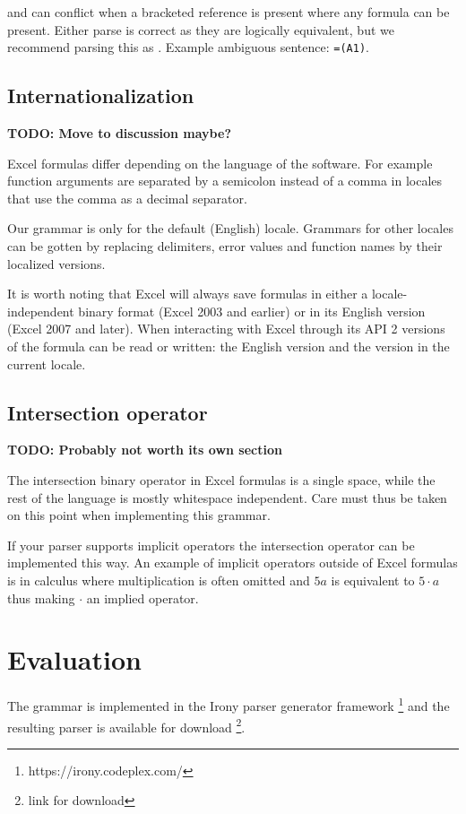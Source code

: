 \documentclass[conference]{IEEEtran}
\newcommand{\todo}[1]{\textbf{TODO: #1}}
\begin{document}
 and  can conflict when a bracketed reference is present where any formula can be present. Either parse is correct as they are logically equivalent, but we recommend parsing this as . Example ambiguous sentence: \texttt{=(A1)}.

\subsection{Internationalization}

\todo{Move to discussion maybe?}

Excel formulas differ depending on the language of the software. For example function arguments are separated by a semicolon instead of a comma in locales that use the comma as a decimal separator.

Our grammar is only for the default (English) locale. Grammars for other locales can be gotten by replacing delimiters, error values and function names by their localized versions.

It is worth noting that Excel will always save formulas in either a locale-independent binary format (Excel 2003 and earlier) or in its English version (Excel 2007 and later). When interacting with Excel through its API 2 versions of the formula can be read or written: the English version and the version in the current locale.

\subsection{Intersection operator}

\todo{Probably not worth its own section}

The intersection binary operator in Excel formulas is a single space, while the rest of the language is mostly whitespace independent.
Care must thus be taken on this point when implementing this grammar.

If your parser supports implicit operators the intersection operator can be implemented this way.
An example of implicit operators outside of Excel formulas is in calculus where multiplication is often omitted and $5a$ is equivalent to $5 \cdot a$ thus making $\cdot$ an implied operator.


\section{Evaluation}
The grammar is implemented in the Irony parser generator framework \footnote{https://irony.codeplex.com/} and the resulting parser is available for download \footnote{link for download}.
\end{document}
